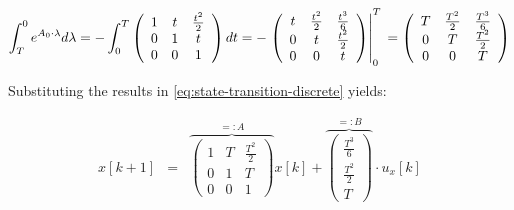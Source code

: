 \documentclass[english,ngerman]{KITreprt}
\begin{document}
\begin{equation}
\int^{0}_{T} e^{A_0 \cdot \lambda} d\lambda =  -\int^{T}_{0} \left(\begin{array}{ccc}1 & t & \frac{t^2}{2}\\0 & 1 & t\\ 0 & 0 & 1\end{array}\right) dt
                                            =  -\left.\left(\begin{array}{ccc} %
                                                          t & \frac{t^2}{2} & \frac{t^3}{6} \\ %
                                                          0 & t             & \frac{t^2}{2} \\ %
                                                          0 & 0             & t %
                                                 \end{array}\right)\right|_{0}^{T}\\
                                            =   \left(\begin{array}{ccc} %
                                                          T & \frac{T^2}{2} & \frac{T^3}{6} \\ %
                                                          0 & T             & \frac{T^2}{2} \\ %
                                                          0 & 0             & T %
                                                \end{array}\right)
\end{equation}

Substituting the results in \ref{eq:state-transition-discrete} yields:

\begin{eqnarray} \label{eq:state-transition-result}
x[k+1] & = &  \overbrace{\left(\begin{array}{ccc} %
                     1 & T & \frac{T^2}{2} \\ %
                     0 & 1             & T \\ %
                     0 & 0             & 1 %
               \end{array}\right)}^{=: A} x[k]
             + \overbrace{\left(\begin{array}{ccc} %
                      \frac{T^3}{6} \\ %
                      \frac{T^2}{2} \\ %
                      T %
               \end{array}\right)}^{=: B} \cdot u_x[k]
\end{eqnarray}
\end{document}
